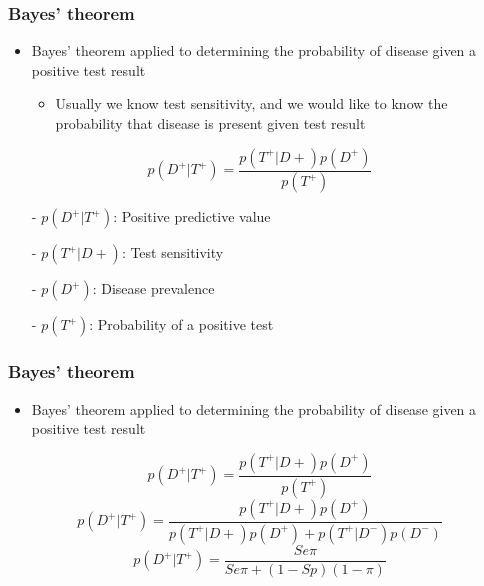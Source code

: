 \documentclass{beamer}
\begin{document}
\begin{frame}
\frametitle{Bayes’ theorem}
\begin{itemize}
 \item{Bayes’ theorem applied to determining the probability of disease given a positive test result}
 \begin{itemize}
  \item{Usually we know test sensitivity, and we would like to know the probability that disease is present given test result}
 \end{itemize}
\end{itemize}
\vspace{1cm}
\begin{large}
$$p(D^+|T^+)=\frac{p(T^+|D+)p(D^+)}{p(T^+)}$$
\end{large}
\begin{itemize}
 \item[-]{$p(D^+|T^+)$: Positive predictive value}
 \item[-]{$p(T^+|D+)$: Test sensitivity}
 \item[-]{$p(D^+)$: Disease prevalence}
 \item[-]{$p(T^+)$: Probability of a positive test}
\end{itemize}
\end{frame}

\begin{frame}
\frametitle{Bayes’ theorem}
\begin{itemize}
 \item{Bayes’ theorem applied to determining the probability of disease given a positive test result}
\end{itemize}
\vspace{.5cm}
$$p(D^+|T^+)=\frac{p(T^+|D+)p(D^+)}{p(T^+)}$$
\pause
\vspace{.5cm}
$$p(D^+|T^+)=\frac{p(T^+|D+)p(D^+)}{p(T^+|D+)p(D^+)+p(T^+|D^-)p(D^-)}$$
\pause
\vspace{.5cm}
$$p(D^+|T^+)=\frac{Se \pi}{Se \pi + (1-Sp)(1-\pi)}$$
\end{frame}
\end{document}
